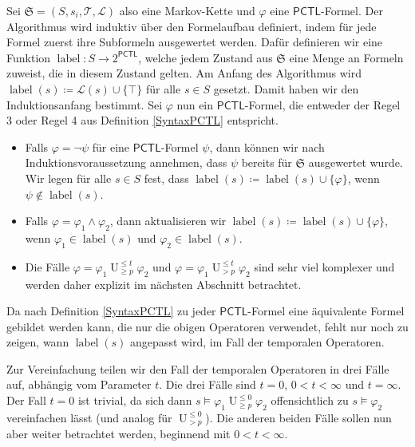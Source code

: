 \documentclass{lni}
\theoremstyle{def_style}
\theoremstyle{break}
\newcommand{\UEqual}[4]{#1\operatorname{U}^{\leq #2}_{\geq #3}#4}
\newcommand{\UStrict}[4]{#1\operatorname{U}^{\leq #2}_{> #3}#4}
\newcommand{\PCTL}{\mathsf{PCTL}}
\begin{document}
Sei $\mathfrak{S}=(S,s_i,\mathcal{T},\mathcal{L})$ also eine Markov-Kette und $\varphi$ eine $\PCTL$-Formel. 
Der Algorithmus wird induktiv über den Formelaufbau definiert, indem für jede Formel zuerst ihre Subformeln ausgewertet werden. 
Dafür definieren wir eine Funktion $\operatorname{label}:S\to 2^\PCTL$, welche jedem Zustand aus $\mathfrak{S}$ eine Menge an Formeln zuweist, die in diesem Zustand gelten.
Am Anfang des Algorithmus wird $\operatorname{label}(s)\coloneqq\mathcal{L}(s)\cup\{\top\}$ für alle $s\in S$ gesetzt. Damit haben wir den Induktionsanfang bestimmt. Sei $\varphi$ nun ein $\PCTL$-Formel, die entweder der Regel 3 oder Regel 4 aus Definition \ref{SyntaxPCTL} entspricht.
\begin{itemize}
	\item Falls $\varphi=\neg\psi$ für eine $\PCTL$-Formel $\psi$, dann können wir nach Induktionsvoraussetzung annehmen, dass $\psi$ bereits für $\mathfrak{S}$ ausgewertet wurde. Wir legen für alle $s\in S$ fest, dass $\operatorname{label}(s)\coloneqq \operatorname{label}(s) \cup\{\varphi\}$, wenn $\psi \notin \operatorname{label}(s)$.
	\item Falls $\varphi = \varphi_1\land\varphi_2$, dann aktualisieren wir $\operatorname{label}(s)\coloneqq \operatorname{label}(s) \cup \{\varphi\}$, wenn $\varphi_1\in \operatorname{label}(s)$ und $\varphi_2\in \operatorname{label}(s)$.
	\item Die Fälle $\varphi = \UEqual{\varphi_1}{t}{p}{\varphi_2}$ und $\varphi = \UStrict{\varphi_1}{t}{p}{\varphi_2}$ sind sehr viel komplexer und werden daher explizit im nächsten Abschnitt betrachtet.
\end{itemize}
Da nach Definition \ref{SyntaxPCTL} zu jeder $\PCTL$-Formel eine äquivalente Formel gebildet werden kann, die nur die obigen Operatoren verwendet, fehlt nur noch zu zeigen, wann $\operatorname{label}(s)$ angepasst wird, im Fall der temporalen Operatoren. \cite{hansson1994logic}

Zur Vereinfachung teilen wir den Fall der temporalen Operatoren in drei Fälle auf, abhängig vom Parameter $t$. Die drei Fälle sind $t=0$, $0<t<\infty$ und $t=\infty$.
Der Fall $t=0$ ist trivial, da sich dann $s \models \UEqual{\varphi_1}{0}{p}{\varphi_2}$ offensichtlich zu $s \models \varphi_2$ vereinfachen lässt (und analog für $\UStrict{}{0}{p}{}$).
Die anderen beiden Fälle sollen nun aber weiter betrachtet werden, beginnend mit $0<t<\infty$.
\end{document}
